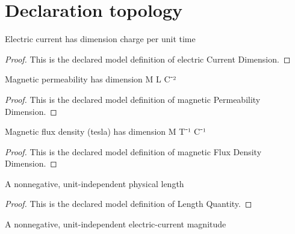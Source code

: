 \section{Declaration topology}
\begin{definition}
  \label{def:physics:phyx-mini-0961:phyxminiproblems-problemphyxmini0961-electriccurrentdimension}
  Electric current has dimension charge per unit time
\end{definition}
\begin{proof}
  This is the declared model definition of electric Current Dimension.
\end{proof}
\begin{definition}
  \label{def:physics:phyx-mini-0961:phyxminiproblems-problemphyxmini0961-magneticpermeabilitydimension}
  Magnetic permeability has dimension M L C⁻²
\end{definition}
\begin{proof}
  This is the declared model definition of magnetic Permeability Dimension.
\end{proof}
\begin{definition}
  \label{def:physics:phyx-mini-0961:phyxminiproblems-problemphyxmini0961-magneticfluxdensitydimension}
  Magnetic flux density (tesla) has dimension M T⁻¹ C⁻¹
\end{definition}
\begin{proof}
  This is the declared model definition of magnetic Flux Density Dimension.
\end{proof}
\begin{definition}
  \label{def:physics:phyx-mini-0961:phyxminiproblems-problemphyxmini0961-lengthquantity}
  A nonnegative, unit-independent physical length
\end{definition}
\begin{proof}
  This is the declared model definition of Length Quantity.
\end{proof}
\begin{definition}
  \label{def:physics:phyx-mini-0961:phyxminiproblems-problemphyxmini0961-electriccurrentmagnitude}
  A nonnegative, unit-independent electric-current magnitude
\end{definition}
